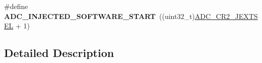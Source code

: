 \begin{DoxyCompactItemize}
\item 
\#define {\bfseries A\+D\+C\+\_\+\+I\+N\+J\+E\+C\+T\+E\+D\+\_\+\+S\+O\+F\+T\+W\+A\+R\+E\+\_\+\+S\+T\+A\+RT}~((uint32\+\_\+t)\hyperlink{group___peripheral___registers___bits___definition_gaab3aa5d0e2a4b77960ec8f3b425a3eac}{A\+D\+C\+\_\+\+C\+R2\+\_\+\+J\+E\+X\+T\+S\+EL} + 1)\hypertarget{group___a_d_c_ex___external__trigger___source___injected_gae90a9b5e1ae0cb2ef2c711d90b0b382b}{}\label{group___a_d_c_ex___external__trigger___source___injected_gae90a9b5e1ae0cb2ef2c711d90b0b382b}

\end{DoxyCompactItemize}


\subsection{Detailed Description}
